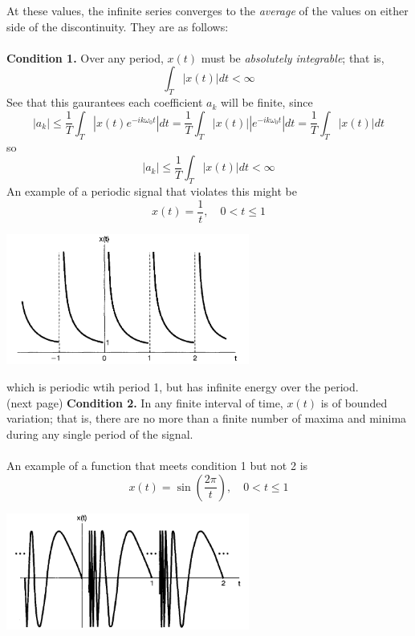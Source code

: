 \documentclass{report}
\begin{document}
At these values, the infinite series converges to the \textit{average} of the values on either side
of the discontinuity. They are as follows:\\
\vspace{1mm}\\
\textbf{Condition 1.} Over any period, $x(t)$ must be \textit{absolutely integrable}; that is,
\begin{equation*}
\int_T|x(t)|dt<\infty
\end{equation*}
See that this gaurantees each coefficient $a_k$ will be finite, since
\begin{equation*}
|a_k|\leq\frac{1}{T}\int_T|x(t)e^{-ik\omega_0t}|dt=\frac{1}{T}\int_T|x(t)||e^{-ik\omega_0t}|dt=\frac{1}{T}\int_T|x(t)|dt
\end{equation*}
so
\begin{equation*}
|a_k|\leq\frac{1}{T}\int_T|x(t)|dt<\infty
\end{equation*}
An example of a periodic signal that violates this might be
\begin{equation*}
x(t)=\frac{1}{t},\quad0<t\leq1
\end{equation*}
\begin{center}
\includegraphics[width=8cm]{a58}\\
\end{center}
which is periodic wtih period 1, but has infinite energy over the period.\\
(next page)\newpage
\noindent\textbf{Condition 2.} In any finite interval of time, $x(t)$ is of bounded variation; that is, there are no more than a finite number of maxima and minima during any single period of the signal.\\
\vspace{1mm}\\
An example of a function that meets condition 1 but not 2 is
\begin{equation*}
x(t)=\sin\left(\frac{2\pi}{t}\right),\quad0<t\leq1
\end{equation*}
\begin{center}
\includegraphics[width=8cm]{a59}\\
\end{center}
\end{document}
